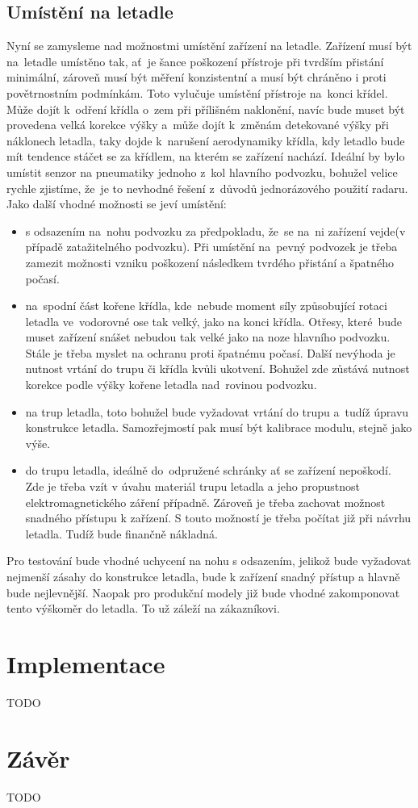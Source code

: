 	\section{Umístění na letadle}\label{navrhReseni::umisteniNaLetadle}
		Nyní se zamysleme nad možnostmi umístění zařízení na letadle. Zařízení musí být na~letadle umístěno tak, ať~je šance poškození přístroje při tvrdším přistání minimální, zároveň musí být měření konzistentní a musí být chráněno i proti povětrnostním podmínkám. Toto vylučuje umístění přístroje na~konci křídel. Může dojít k~odření křídla o~zem při přílišném naklonění, navíc bude muset být provedena velká korekce výšky a~může dojít k~změnám detekované výšky při náklonech letadla, taky dojde k~narušení aerodynamiky křídla, kdy letadlo bude mít tendence stáčet se za křídlem, na kterém se zařízení nachází. Ideální by bylo umístit senzor na pneumatiky jednoho z~kol hlavního podvozku, bohužel velice rychle zjistíme, že~je to nevhodné řešení z~důvodů jednorázového použití radaru. Jako další vhodné možnosti se jeví umístění:
		\begin{itemize}
			\item s odsazením na~nohu podvozku za předpokladu, že~se na~ni zařízení vejde(v případě zatažitelného podvozku). Při umístění na~pevný podvozek je třeba zamezit možnosti vzniku poškození následkem tvrdého přistání a špatného počasí. 
			\item na~spodní část kořene křídla, kde~nebude moment síly způsobující rotaci letadla ve~vodorovné ose tak velký, jako na konci křídla. Otřesy, které~bude muset zařízení snášet nebudou tak velké jako na noze hlavního podvozku. Stále je třeba myslet na ochranu proti špatnému počasí. Další nevýhoda je nutnost vrtání do trupu či křídla kvůli ukotvení. Bohužel zde zůstává nutnost korekce podle výšky kořene letadla nad~rovinou podvozku.
			\item na trup letadla, toto bohužel bude vyžadovat vrtání do trupu a~tudíž úpravu konstrukce letadla. Samozřejmostí pak musí být kalibrace modulu, stejně jako výše.
			\item do trupu letadla, ideálně do~odpružené schránky ať se zařízení nepoškodí. Zde je třeba vzít v úvahu materiál trupu letadla a jeho propustnost elektromagnetického záření případně. Zároveň je třeba zachovat možnost snadného přístupu k zařízení. S touto možností je třeba počítat již při návrhu letadla. Tudíž bude finančně nákladná.
		\end{itemize} 
		Pro testování bude vhodné uchycení na nohu s odsazením, jelikož bude vyžadovat nejmenší zásahy do konstrukce letadla, bude k zařízení snadný přístup a hlavně bude nejlevnější.
		Naopak pro produkční modely již bude vhodné zakomponovat tento výškoměr do letadla. To už záleží na zákazníkovi.
		
		
\chapter{Implementace}
	TODO
\chapter{Závěr}
	TODO

